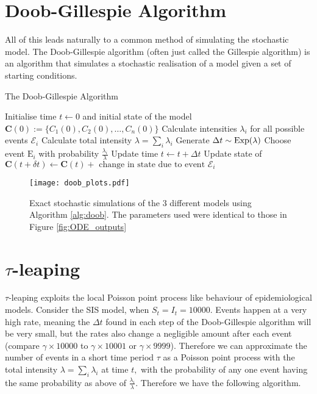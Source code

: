\section{Doob-Gillespie Algorithm}

All of this leads naturally to a common method of simulating the stochastic model. The Doob-Gillespie algorithm (often just called the Gillespie algorithm) is an algorithm that simulates a stochastic realisation of a model given a set of starting conditions.

\begin{algorithm}
    \caption{The Doob-Gillespie Algorithm}\label{alg:doob}
    \begin{algorithmic}[1]
        \State Initialise time $t \gets 0$ and initial state of the model $\mathbf{C}(0) := \{C_1(0), C_2(0), \dots, C_n(0)\}$
        \State Calculate intensities $\lambda_i$ for all possible events $\mathcal{E}_i$
        \State Calculate total intensity $\lambda = \sum_i \lambda_i$
        \State Generate $\Delta t \sim \operatorname{Exp}(\lambda)$
        \State Choose event $\mathrm{E}_i$ with probability $\frac{\lambda_i}{\lambda}$
        \State Update time $t \gets t + \Delta t$
        \State Update state of $\mathbf{C}(t + \delta t) \gets \mathbf{C}(t) + \text{ change in state due to event } \mathcal{E}_i$
        \EndWhile
    \end{algorithmic}
\end{algorithm}

\begin{figure}[htbp]
    \texttt{[image: doob\_plots.pdf]}
    \caption{Exact stochastic simulations of the 3 different models using Algorithm \ref{alg:doob}. The parameters used were identical to those in Figure \ref{fig:ODE_outputs}}\label{fig:doob_outputs}
\end{figure}

\section{\texorpdfstring{$\tau$}{Lg}-leaping}

$\tau$-leaping exploits the local Poisson point process like behaviour of epidemiological models. Consider the SIS model, when $S_t = I_t = 10000.$ Events happen at a very high rate, meaning the $\Delta t$ found in each step of the Doob-Gillespie algorithm will be very small, but the rates also change a negligible amount after each event (compare $\gamma\times 10000$ to $\gamma\times 10001$ or $\gamma\times 9999$). Therefore we can approximate the number of events in a short time period $\tau$ as a Poisson point process with the total intensity $\lambda = \sum_i \lambda_i$ at time $t,$ with the probability of any one event having the same probability as above of $\frac{\lambda_i}{\lambda}.$ Therefore we have the following algorithm.

